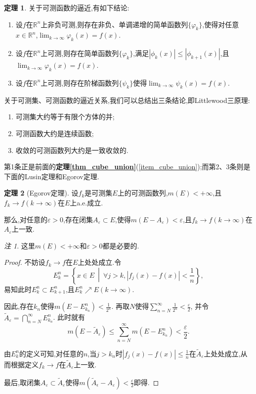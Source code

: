 \documentclass{ctexart}
\theoremstyle{definition}
\newtheorem{theorem}{定理}
\theoremstyle{remark}
\newtheorem*{remark}{注}
\begin{document}
	\begin{theorem}\label{thm_step_approx}
		关于可测函数的逼近,有如下结论:
		\begin{enumerate}
			\item 设$f$在$\mathbb{R}^n$上非负可测,则存在非负、单调递增的简单函数列$\{\varphi_k\}$,使得对任意$x\in\mathbb{R}^n$,$\lim_{k\to\infty}{\varphi_k(x)}=f(x)$.
			\item 设$f$在$\mathbb{R}^n$上可测,则存在简单函数列$\{\varphi_k\}$,满足$|\phi_k(x)|\le|\phi_{k+1}(x)|$,且$\lim_{k\to\infty}{\varphi_k(x)}=f(x)$.
			\item\label{item_step_approx} 设$f$在$\mathbb{R}^n$上可测,则存在阶梯函数列$\{\psi_k\}$使得$\lim_{k\to\infty}{\psi_k(x)}=f(x)$.
		\end{enumerate}
	\end{theorem}
	
	\hspace*{\fill}
	
	关于可测集、可测函数的逼近关系,我们可以总结出三条结论,即Littlewood三原理:
	
	\begin{enumerate}
		\item 可测集大约等于有限个方体的并;
		\item 可测函数大约是连续函数;
		\item 收敛的可测函数列大约是一致收敛的.
	\end{enumerate}
	
	第1条正是前面的\textbf{定理\ref{thm_cube_union}}(\ref{item_cube_union});而第2、3条则是下面的Lusin定理和Egorov定理.
	
	\begin{theorem}[Egorov定理]
		设$f_k$是可测集$E$上的可测函数列,$m(E)<+\infty$,且$f_k\to f(k\to\infty)$在$E$上a.e.成立.
		
		那么,对任意的$\varepsilon>0$,存在闭集$A_\varepsilon\subset E$,使得$m(E-A_\varepsilon)<\varepsilon$,且$f_k\to f(k\to\infty)$在$A_\varepsilon$上一致.
	\end{theorem}
	\begin{remark}
		这里$m(E)<+\infty$和$\varepsilon>0$都是必要的.
	\end{remark}
	\begin{proof}
		不妨设$f_k\to f$在$E$上处处成立.令
		$$E_k^n=\left\{x\in E\ \middle|\ \forall j>k,|f_j(x)-f(x)|<\frac{1}{n}\right\},$$
		易知此时$E_k^n\subset E_{k+1}^n$,且$E_k^n\nearrow E(k\to\infty)$.
		
		因此,存在$k_n$使得$m(E-E_{k_n}^n)<\frac{1}{2^n}$.
		再取$N$使得$\sum_{n=N}^\infty{\frac{1}{2^n}}<\frac{\varepsilon}{2}$,
		并令$\widetilde{A}_\varepsilon=\bigcap_{n=N}^\infty{E_{k_n}^n}$.
		此时就有
		$$m(E-\widetilde{A}_\varepsilon)\le\sum_{n=N}^\infty{m(E-E_{k_n}^n)}<\frac{\varepsilon}{2}.$$
		
		由$E_k^n$的定义可知,对任意的$n$,当$j>k_n$时$|f_j(x)-f(x)|\le\frac{1}{n}$在$\widetilde{A}_\varepsilon$上处处成立,从而根据定义$f_k\to f$在$\widetilde{A}_\varepsilon$上一致.
		
		最后,取闭集$A_\varepsilon\subset\widetilde{A}_\varepsilon$使得$m(\widetilde{A}_\epsilon-A_\varepsilon)<\frac{\varepsilon}{2}$即得.
	\end{proof}
	
\end{document}
